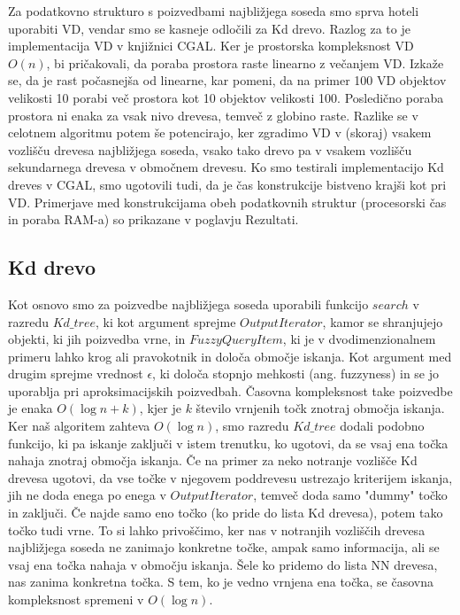 \documentclass[a4paper, 12pt]{book}
\begin{document}
Za podatkovno strukturo s poizvedbami najbližjega soseda smo sprva hoteli uporabiti VD, vendar smo se kasneje odločili za Kd drevo. Razlog za to je implementacija VD v knjižnici CGAL. Ker je prostorska kompleksnost VD $O(n)$, bi pričakovali, da poraba prostora raste linearno z večanjem VD. Izkaže se, da je rast počasnejša od linearne, kar pomeni, da na primer 100 VD objektov velikosti 10 porabi več prostora kot 10 objektov velikosti 100. Posledično poraba prostora ni enaka za vsak nivo drevesa, temveč z globino raste. Razlike se v celotnem algoritmu potem še potencirajo, ker zgradimo VD v (skoraj) vsakem vozlišču drevesa najbližjega soseda, vsako tako drevo pa v vsakem vozlišču sekundarnega drevesa v območnem drevesu. Ko smo testirali implementacijo Kd dreves v CGAL, smo ugotovili tudi, da je čas konstrukcije bistveno krajši kot pri VD. Primerjave med konstrukcijama obeh podatkovnih struktur (procesorski čas in poraba RAM-a) so prikazane v poglavju Rezultati.

\subsection{Kd drevo}

Kot osnovo smo za poizvedbe najbližjega soseda uporabili funkcijo $search$ v razredu $Kd{\_}tree$, ki kot argument sprejme $OutputIterator$, kamor se shranjujejo objekti, ki jih poizvedba vrne, in $FuzzyQueryItem$, ki je v dvodimenzionalnem primeru lahko krog ali pravokotnik in določa območje iskanja. Kot argument med drugim sprejme vrednost $\epsilon$, ki določa stopnjo mehkosti (ang. fuzzyness) in se jo uporablja pri aproksimacijskih poizvedbah. Časovna kompleksnost take poizvedbe je enaka $O(\log n + k)$, kjer je $k$ število vrnjenih točk znotraj območja iskanja. Ker naš algoritem zahteva $O(\log n)$, smo razredu $Kd{\_}tree$ dodali podobno funkcijo, ki pa iskanje zaključi v istem trenutku, ko ugotovi, da se vsaj ena točka nahaja znotraj območja iskanja. Če na primer za neko notranje vozlišče Kd drevesa ugotovi, da vse točke v njegovem poddrevesu ustrezajo kriterijem iskanja, jih ne doda enega po enega v $OutputIterator$, temveč doda samo "dummy" točko in zaključi. Če najde samo eno točko (ko pride do lista Kd drevesa), potem tako točko tudi vrne. To si lahko privoščimo, ker nas v notranjih vozliščih drevesa najbližjega soseda ne zanimajo konkretne točke, ampak samo informacija, ali se vsaj ena točka nahaja v območju iskanja. Šele ko pridemo do lista NN drevesa, nas zanima konkretna točka. S tem, ko je vedno vrnjena ena točka, se časovna kompleksnost spremeni v $O(\log n)$. 
\end{document}
